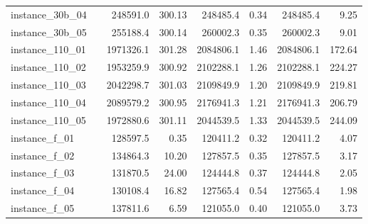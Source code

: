 \documentclass[12pt,a4paper,openright,twoside]{book}
\begin{document}
\begin{table}[H]
{\begin{tabular}{|ll|rr|rr|rr|}
 instance\_30b\_04             &     &     248591.0 &  300.13 &   248485.4 &     0.34 &   248485.4 &     9.25 \\  
 instance\_30b\_05             &     &     255188.4 &  300.14 &   260002.3 &     0.35 &   260002.3 &     9.01 \\  
 instance\_110\_01            &     &    1971326.1 &  301.28 &  2084806.1 &     1.46 &  2084806.1 &   172.64 \\  
 instance\_110\_02            &     &    1953259.9 &  300.92 &  2102288.1 &     1.26 &  2102288.1 &   224.27 \\  
 instance\_110\_03            &     &    2042298.7 &  301.03 &  2109849.9 &     1.20 &  2109849.9 &   219.81 \\  
 instance\_110\_04            &     &    2089579.2 &  300.95 &  2176941.3 &     1.21 &  2176941.3 &   206.79 \\  
 instance\_110\_05            &     &    1972880.6 &  301.11 &  2044539.5 &     1.33 &  2044539.5 &   244.09 \\  
 instance\_f\_01              &     &     128597.5 &    0.35 &   120411.2 &     0.32 &   120411.2 &     4.07 \\  
 instance\_f\_02              &     &     134864.3 &   10.20 &   127857.5 &     0.35 &   127857.5 &     3.17 \\  
 instance\_f\_03              &     &     131870.5 &   24.00 &   124444.8 &     0.37 &   124444.8 &     2.05 \\  
 instance\_f\_04              &     &     130108.4 &   16.82 &   127565.4 &     0.54 &   127565.4 &     1.98 \\  
 instance\_f\_05              &     &     137811.6 &    6.59 &   121055.0 &     0.40 &   121055.0 &     3.73 \\ 
  \hline
\end{tabular}
}
\end{table}
\end{document}
